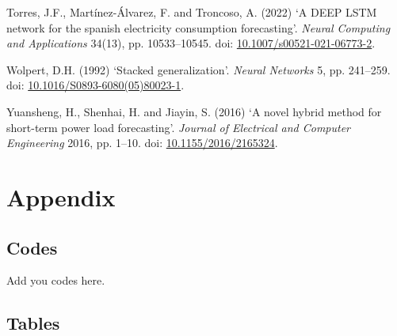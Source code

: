 \documentclass[
]{article}
\newlength{\cslhangindent}
\newenvironment{CSLReferences}[2] %
 {\begin{list}{}{%
  \setlength{\itemindent}{0pt}
  \setlength{\leftmargin}{0pt}
  \setlength{\parsep}{0pt}
  \ifodd #1
   \setlength{\leftmargin}{\cslhangindent}
   \setlength{\itemindent}{-1\cslhangindent}
  \fi
  \setlength{\itemsep}{#2\baselineskip}}}
 {\end{list}}
\begin{document}
\begin{CSLReferences}{0}{1}
Torres, J.F., Martínez-Álvarez, F. and Troncoso, A. (2022) {`A DEEP LSTM
network for the spanish electricity consumption forecasting'}.
\emph{Neural Computing and Applications} 34(13), pp. 10533--10545. doi:
\href{https://doi.org/10.1007/s00521-021-06773-2}{10.1007/s00521-021-06773-2}.

Wolpert, D.H. (1992) {`Stacked generalization'}. \emph{Neural Networks}
5, pp. 241--259. doi:
\href{https://doi.org/10.1016/S0893-6080(05)80023-1}{10.1016/S0893-6080(05)80023-1}.

Yuansheng, H., Shenhai, H. and Jiayin, S. (2016) {`A novel hybrid method
for short-term power load forecasting'}. \emph{Journal of Electrical and
Computer Engineering} 2016, pp. 1--10. doi:
\href{https://doi.org/10.1155/2016/2165324}{10.1155/2016/2165324}.

\end{CSLReferences}




\section*{Appendix}\label{appendix}

\subsection*{\texorpdfstring{\textbf{Codes}}{Codes}}\label{codes}

Add you codes here.

\subsection*{\texorpdfstring{\textbf{Tables}}{Tables}}\label{tables}
\end{document}
